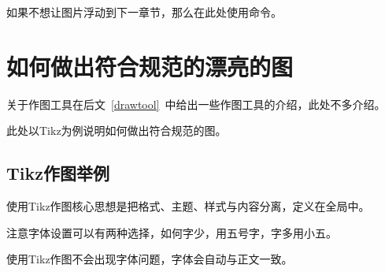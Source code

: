 \begin{figure}[!h]
\begin{sideways}
\begin{minipage}{\textheight}
    \end{minipage}
  \end{sideways}
\end{figure}

\clearpage

如果不想让图片浮动到下一章节，那么在此处使用命令。

\section{如何做出符合规范的漂亮的图}
关于作图工具在后文~\ref{drawtool}~中给出一些作图工具的介绍，此处不多介绍。

此处以Tikz为例说明如何做出符合规范的图。

\subsection{Tikz作图举例}
使用Tikz作图核心思想是把格式、主题、样式与内容分离，定义在全局中。

注意字体设置可以有两种选择，如何字少，用五号字，字多用小五。

使用Tikz作图不会出现字体问题，字体会自动与正文一致。

